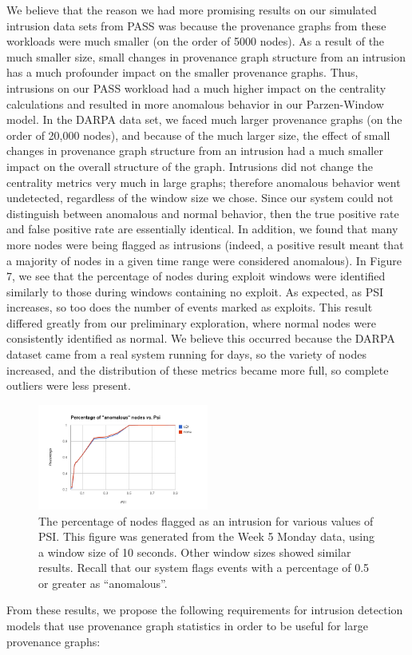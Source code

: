\documentclass[10pt,twocolumn]{article}
\begin{document}
We believe that the reason we had more promising results on our simulated intrusion data sets from PASS was because the provenance graphs from these workloads were much smaller (on the order of 5000 nodes). As a result of the much smaller size, small changes in provenance graph structure from an intrusion has a much profounder impact on the smaller provenance graphs. Thus, intrusions on our PASS workload had a much higher impact on the centrality calculations and resulted in more anomalous behavior in our Parzen-Window model. In the DARPA data set, we faced much larger provenance graphs (on the order of 20,000 nodes), and because of the much larger size, the effect of small changes in provenance graph structure from an intrusion had a much smaller impact on the overall structure of the graph. Intrusions did not change the centrality metrics very much in large graphs; therefore anomalous behavior went undetected, regardless of the window size we chose. Since our system could not distinguish between anomalous and normal behavior, then the true positive rate and false positive rate are essentially identical. In addition, we found that many more nodes were being flagged as intrusions (indeed, a positive result meant that a majority of nodes in a given time range were considered anomalous). In Figure 7, we see that the percentage of nodes during exploit windows were identified similarly to those during windows containing no exploit. As expected, as PSI increases, so too does the number of events marked as exploits. This result differed greatly from our preliminary exploration, where normal nodes were consistently identified as normal. We believe this occurred because the DARPA dataset came from a real system running for days, so the variety of nodes increased, and the distribution of these metrics became more full, so complete outliers were less present. 
\begin{figure}
  \label{intrusion-v-psi}
  \centering
    \includegraphics[width=0.5\textwidth]{img/intrusion_v_psi.png}
    \caption{The percentage of nodes flagged as an intrusion for various values of PSI. This figure was generated from the Week 5 Monday data, using a window size of 10 seconds. Other window sizes showed similar results. Recall that our system flags events with a percentage of 0.5 or greater as ``anomalous''.} 
\end{figure}
From these results, we propose the following requirements for intrusion detection models that use provenance graph statistics in order to be useful for large provenance graphs:
\end{document}
